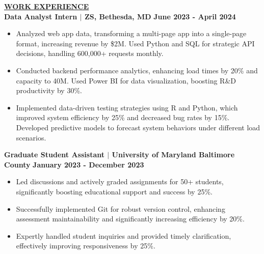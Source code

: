 \documentclass{article}
\begin{document}
\vspace{2mm} 

\noindent \textbf{\underline{WORK EXPERIENCE}} \\
\noindent \textbf{Data Analyst Intern $\mid$ ZS, Bethesda, MD}  \hfill \textbf{June 2023 - April 2024}
\begin{itemize}[noitemsep,nolistsep,leftmargin=*]
\item {\small Analyzed web app data, transforming a multi-page app into a single-page format, increasing revenue by \$2M. Used Python and SQL for strategic API decisions, handling 600,000+ requests monthly.}
\item {\small Conducted backend performance analytics, enhancing load times by 20\% and capacity to 40M. Used Power BI for data visualization, boosting R&D productivity by 30\%.}
\item {\small Implemented data-driven testing strategies using R and Python, which improved system efficiency by 25\% and decreased bug rates by 15\%. Developed predictive models to forecast system behaviors under different load scenarios.}
\end{itemize}

\vspace{2mm} 

\noindent \textbf{Graduate Student Assistant $\mid$ University of Maryland Baltimore County}  \hfill \textbf{January 2023 - December 2023}
\begin{itemize}[noitemsep,nolistsep,leftmargin=*]
\item {\small Led discussions and actively graded assignments for 50+ students, significantly boosting educational support and success by 25\%.}
\item {\small Successfully implemented Git for robust version control, enhancing assessment maintainability and significantly increasing efficiency by 20\%.}
\item {\small Expertly handled student inquiries and provided timely clarification, effectively improving responsiveness by 25\%.}
\end{itemize}

\vspace{2mm} 
\end{document}
